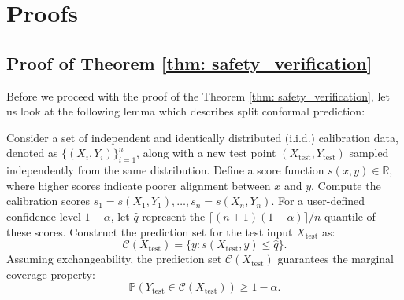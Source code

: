 

\section{Proofs}

\subsection{Proof of Theorem \eqref{thm: safety_verification}}\label{appendix: proof_safety}

Before we proceed with the proof of the Theorem \eqref{thm: safety_verification}, let us look at the following lemma which describes split conformal prediction:

\begin{lemma}
\label{lem:split_conformal}
Consider a set of independent and identically distributed (i.i.d.) calibration data, denoted as \(\{(X_i, Y_i)\}_{i=1}^n\), along with a new test point \((X_{\text{test}}, Y_{\text{test}})\) sampled independently from the same distribution. Define a score function \(s(x, y) \in \mathbb{R}\), where higher scores indicate poorer alignment between \(x\) and \(y\). Compute the calibration scores \(s_1 = s(X_1, Y_1), \ldots, s_n = s(X_n, Y_n)\). For a user-defined confidence level \(1-\alpha\), let \(\hat{q}\) represent the \(\lceil (n+1)(1-\alpha) \rceil / n\) quantile of these scores. Construct the prediction set for the test input \(X_{\text{test}}\) as:
\[
\mathcal{C}(X_{\text{test}}) = \{y : s(X_{\text{test}}, y) \leq \hat{q} \}.
\]
Assuming exchangeability, the prediction set \(\mathcal{C}(X_{\text{test}})\) guarantees the marginal coverage property:
\[
\mathbb{P}(Y_{\text{test}} \in \mathcal{C}(X_{\text{test}})) \geq 1 - \alpha.
\]
\end{lemma}

